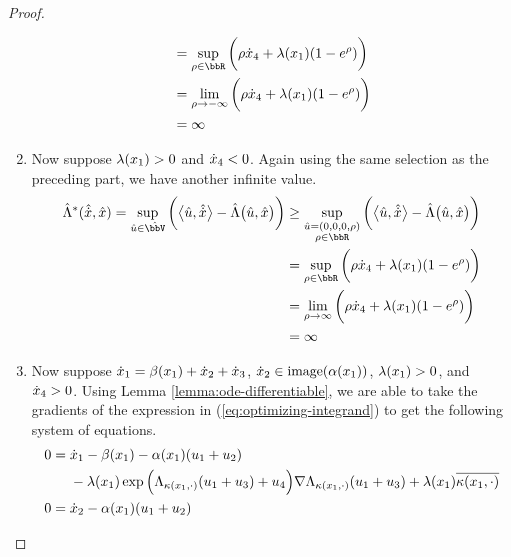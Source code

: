 \begin{proof}
\begin{enumerate}
\begin{align*}
        &= \sup_{\rho\in\bbR} \bigg( \rho\diffVar_4 + \affInt(\stateVar_1) (1 - e^\rho) \bigg) \\
        &= \lim_{\rho\rightarrow-\infty} \bigg( \rho\diffVar_4 + \affInt(\stateVar_1) (1 - e^\rho) \bigg) \\
        &= \infty
      \end{align*}
    \item
      Now suppose $\lambda(x_1) > 0$ and $\dot{x}_4 < 0$.
      Again using the same selection as the preceding part, we have another infinite value.
      \begin{align*}
        \hat\ode^*(\hat{\diffVar}, \hat\stateVar) 
        = \sup_{\hat\momentVar \in \hat\vecSpace} \bigg( \bprj{\hat\momentVar}{\hat\diffVar} - \hat\ode\big(\hat\momentVar, \hat\stateVar\big) \bigg) 
        &\geq \sup_{\substack{\hat\momentVar=(0, 0, 0, \rho)  \\ \rho \in \bbR}} \bigg( \bprj{\hat\momentVar}{\hat\diffVar} - \hat\ode\big(\hat\momentVar, \hat\stateVar\big) \bigg) \\
        &= \sup_{\rho\in\bbR} \bigg( \rho\diffVar_4 + \affInt(\stateVar_1) (1 - e^\rho) \bigg) \\
        &= \lim_{\rho\rightarrow\infty} \bigg( \rho\diffVar_4 + \affInt(\stateVar_1) (1 - e^\rho) \bigg) \\
        &= \infty
      \end{align*}
    \item
      Now suppose $\dot{x}_1 = \beta(x_1) + \dot{x}_2 + \dot{x}_3$, $\dot{x}_2 \in \operatorname{image}(\alpha(x_1))$, $\lambda(x_1) > 0$, and $\dot{x}_4 > 0$.
      Using Lemma \ref{lemma:ode-differentiable}, we are able to take the gradients of the expression in (\ref{eq:optimizing-integrand}) to get the following system of equations.
      \begin{align*}
        0 &= \begin{aligned}[t]
          &\diffVar_1 - \affDrift(\stateVar_1) - \affDiff(\stateVar_1) (\momentVar_1 + \momentVar_2) \\
          &- \affInt(\stateVar_1) \exp\Big( \ode_{\affDist(\stateVar_1,\cdot)}(\momentVar_1+\momentVar_3) + \momentVar_4\Big) \nabla\ode_{\affDist(\stateVar_1,\cdot)}(\momentVar_1+\momentVar_3) + \affInt(\stateVar_1) \overline{\affDist(\stateVar_1, \cdot)}
        \end{aligned} \\
        0 &= \diffVar_2 - \affDiff(\stateVar_1) ( \momentVar_1 + \momentVar_2 ) \\

\end{align*}
\end{enumerate}
\end{proof}
